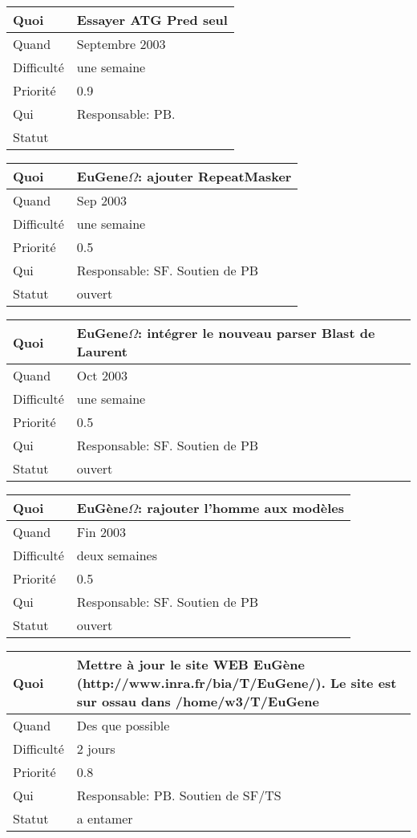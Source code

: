 \documentclass[a4paper,11pt]{article}
\begin{document}
\begin{longtable}{|l|p{7cm}|}\hline
  Quoi & Essayer ATG Pred seul\\\hline
  Quand  &  Septembre 2003\\\hline
  Difficult\'e &  une semaine \\\hline
  Priorit\'e &  0.9\\\hline
  Qui & Responsable: PB.\\\hline
  Statut & \\\hline
\end{longtable}

\begin{longtable}{|l|p{7cm}|}\hline
  Quoi & EuGene$\Omega$: ajouter RepeatMasker\\\hline
  Quand  & Sep 2003 \\\hline
  Difficult\'e & une semaine \\\hline
  Priorit\'e & 0.5 \\\hline
  Qui & Responsable: SF. Soutien de PB\\\hline
  Statut & ouvert\\\hline
\end{longtable}

\begin{longtable}{|l|p{7cm}|}\hline
  Quoi & EuGene$\Omega$: int\'egrer le nouveau parser Blast de Laurent\\\hline
  Quand  & Oct 2003 \\\hline
  Difficult\'e & une semaine \\\hline
  Priorit\'e & 0.5 \\\hline
  Qui & Responsable: SF. Soutien de PB\\\hline
  Statut & ouvert\\\hline
\end{longtable}

\begin{longtable}{|l|p{7cm}|}\hline
  Quoi & EuG\`ene$\Omega$: rajouter l'homme aux mod\`eles\\\hline
  Quand  & Fin 2003 \\\hline
  Difficult\'e &  deux semaines\\\hline
  Priorit\'e & 0.5 \\\hline
  Qui & Responsable: SF. Soutien de PB\\\hline
  Statut & ouvert\\\hline
\end{longtable}

\begin{longtable}{|l|p{7cm}|}\hline
  Quoi & Mettre \`a jour le site WEB EuG\`ene (http://www.inra.fr/bia/T/EuGene/). Le site est sur ossau dans /home/w3/T/EuGene\\\hline
  Quand  &  Des que possible \\\hline
  Difficult\'e &  2 jours \\\hline
  Priorit\'e &  0.8 \\\hline
  Qui & Responsable: PB. Soutien de SF/TS\\\hline
  Statut & a entamer\\\hline
\end{longtable}
\end{document}
